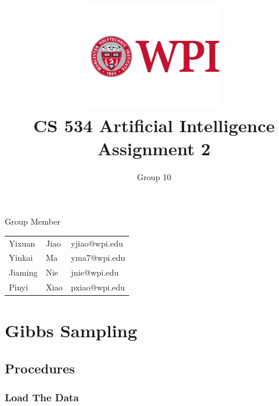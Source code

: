 \documentclass[11pt, a4paper]{article}
\title{\includegraphics[width=0.45\textwidth]{wpi2}
        \\CS 534 Artificial Intelligence \\ Assignment 2 }          %
\author{Group 10 }                    %
\begin{document}
\begin{titlepage}
	
\maketitle
{} %

\begin{center}
Group Member
\end{center}

\begin{table}[htbp] 
\begin{center}
\begin{tabular}{l l l} 
	 
	 Yixuan & Jiao  &   yjiao@wpi.edu \\
     Yinkai & Ma  &   yma7@wpi.edu \\
     Jiaming & Nie  &  jnie@wpi.edu \\
     Pinyi & Xiao  &  pxiao@wpi.edu \\
\end{tabular}
\end{center}
\end{table}



\thispagestyle{empty}  %

\end{titlepage}









\section{Gibbs Sampling}

\subsection{Procedures}

\subsubsection{Load The Data}
\end{document}
